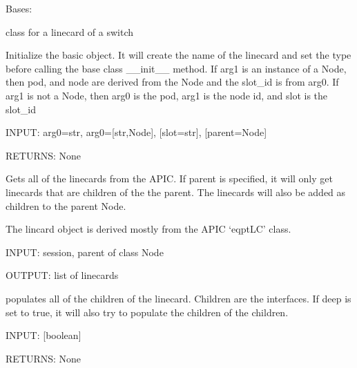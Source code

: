 \documentclass[letterpaper,10pt,english]{sphinxmanual}
\begin{document}

\begin{fulllineitems}
\label{aciphysobject:aciphysobject.Linecard}
Bases: {\hyperref[aciphysobject:aciphysobject.BaseACIPhysModule]{}}

class for a linecard of a switch

Initialize the basic object.  It will create the name of the linecard and set the type
before calling the base class \_\_init\_\_ method.  If arg1 is an instance of a Node, then pod,
and node are derived from the Node and the slot\_id is from arg0.  If arg1 is not a Node, then arg0
is the pod, arg1 is the node id, and slot is the slot\_id

INPUT: arg0=str, arg0={[}str,Node{]}, {[}slot=str{]}, {[}parent=Node{]}

RETURNS: None

\begin{fulllineitems}
\label{aciphysobject:aciphysobject.Linecard.get}
Gets all of the linecards from the APIC.  If parent is specified, it will only get linecards that are
children of the the parent.  The linecards will also be added as children to the parent Node.

The lincard object is derived mostly from the APIC `eqptLC' class.

INPUT: session, parent of class Node

OUTPUT: list of linecards

\end{fulllineitems}


\begin{fulllineitems}
\label{aciphysobject:aciphysobject.Linecard.populate_children}
populates all of the children of the linecard.  Children are the interfaces.
If deep is set to true, it will also try to populate the children of the children.

INPUT: {[}boolean{]}

RETURNS: None

\end{fulllineitems}


\end{fulllineitems}
\end{document}
